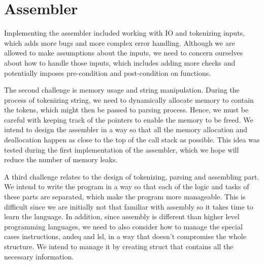 \documentclass{article}
\begin{document}
\section{Assembler}

Implementing the assembler included working with IO and tokenizing inputs, which adds more bugs and more complex error handling. Although we are allowed to make assumptions about the inputs, we need to concern ourselves about how to handle those inputs, which includes adding more checks and potentially imposes pre-condition and post-condition on functions.

The second challenge is memory usage and string manipulation. During the process of tokenizing string, we need to dynamically allocate memory to contain the tokens, which might then be passed to parsing process. Hence, we must be careful with keeping track of the pointers to enable the memory to be freed. We intend to design the assembler in a way so that all the memory allocation and deallocation happen as close to the top of the call stack as possible. This idea was tested during the first implementation of the assembler, which we hope will reduce the number of memory leaks.

A third challenge relates to the design of tokenizing, parsing and assembling part. We intend to write the program in a way so that each of the logic and tasks of these parts are separated, which make the program more manageable. This is difficult since we are initially not that familiar with assembly so it takes time to learn the language. In addition, since assembly is different than higher level programming languages, we need to also consider how to manage the special cases instructions, andeq and lsl, in a way that doesn't compromise the whole structure. We intend to manage it by creating struct that contains all the necessary information.
\end{document}
